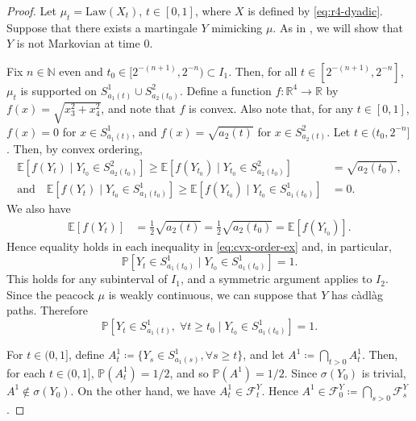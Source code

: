 \documentclass[12pt,oneside]{amsart}
\theoremstyle{definition}
\newcommand{\F}{\mathcal F}
\newcommand{\Law}{\mathrm{Law}}
\newcommand{\N}{\mathbb N}
\newcommand{\R}{\mathbb R}
\def\P{{\mathbb P}}
\def\E{{\mathbb E}}
\def\R{{\mathbb R}}
\numberwithin{equation}{section}
\begin{document}
\begin{proof}
	Let $\mu_t = \Law(X_t)$, $t \in [0, 1]$, where $X$ is defined by \eqref{eq:r4-dyadic}. Suppose that there exists a martingale $Y$ mimicking $\mu$. As in , we will show that $Y$ is not Markovian at time $0$.
	
	Fix $n \in \N$ even and $t_0 \in [2^{-(n + 1)}, 2^{-n}) \subset I_1$. Then, for all $t \in [2^{-(n+1)}, 2^{-n}]$, $\mu_t$ is supported on $S^1_{a_1(t)} \cup S^2_{a_2(t_0)}$. Define a function $f\colon \R^4 \to \R$ by $f(x) = \sqrt{x_3^2 + x_4^2}$, and note that $f$ is convex. Also note that, for any $t \in [0, 1]$, $f(x) = 0$ for $x \in S^1_{a_1(t)}$, and $f(x) = \sqrt{a_2(t)}$ for $x \in S^2_{a_2(t)}$.
	Let $t \in (t_0, 2^{-n}]$. Then, by convex ordering,
	\begin{equation}\label{eq:cvx-order-ex}
		\begin{split}
			\E\!\left[f(Y_t) \mid Y_{t_0} \in S^2_{a_2(t_0)}\right]\! \geq \E \!\left[f(Y_{t_0}) \mid Y_{t_0} \in S^2_{a_2(t_0)}\right]\! & = \sqrt{a_2(t_0)},\\
			\text{and} \quad\E\!\left[f(Y_t) \mid Y_{t_0} \in S^1_{a_1(t_0)} \right]\! \geq \E \!\left[f(Y_{t_0}) \mid Y_{t_0} \in S^1_{a_1(t_0)} \right]\! & = 0.
		\end{split}
	\end{equation}
	We also have
	\begin{equation}
		\begin{split}
			\E[f(Y_t)] & = \frac12 \sqrt{a_2(t)} = \frac 12 \sqrt{a_2(t_0)} = \E[f(Y_{t_0})].
		\end{split}
	\end{equation}
	Hence equality holds in each inequality in \eqref{eq:cvx-order-ex} and, in particular,
	\begin{equation}
		\P\!\left[Y_t \in S^1_{a_1(t_0)} \mid Y_{t_0} \in S^1_{a_1(t_0)}\right]\! = 1.
	\end{equation}
	This holds for any subinterval of $I_1$, and a symmetric argument applies to $I_2$.
	Since the peacock $\mu$ is weakly continuous, we can suppose that $Y$ has c\`adl\`ag paths. Therefore
	\begin{equation}
		\P \!\left[Y_t \in S^1_{a_1(t)}, \; \forall t \geq t_0  \mid Y_{t_0} \in S^1_{a_1(t_0)} \right]\! = 1.
	\end{equation}
	
	For $t \in (0, 1]$, define $A^1_t \coloneqq \{Y_s \in S^1_{a_1(s)}, \forall s \geq t\}$, and let $A^1 \coloneqq \bigcap_{t > 0}A^1_t$. Then, for each $t \in (0, 1]$, $\P(A^1_t) = 1/2$, and so $\P(A^1) = 1/2$. Since $\sigma(Y_0)$ is trivial, $A^1 \notin \sigma(Y_0)$. On the other hand, we have $A^1_t \in \F^Y_t$. Hence $A^1 \in \F^Y_0 \coloneqq \bigcap_{s > 0}\F^Y_s$.
	

\end{proof}
\end{document}
